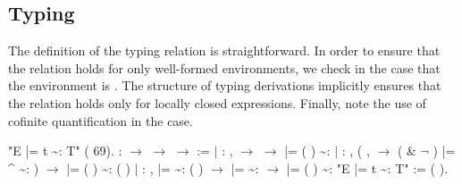 \documentclass[12pt]{report}
\begin{document}
\subsection{Typing}



 The definition of the typing relation is straightforward.  In
    order to ensure that the relation holds for only well-formed
    environments, we check in the  case that the
    environment is .  The structure of typing derivations
    implicitly ensures that the relation holds only for locally closed
    expressions.  Finally, note the use of cofinite quantification in
    the  case. 

\begin{coqdoccode}
\coqdocemptyline
\coqdocnoindent
{} "E |= t \~{}: T" (  69).\coqdoceol
\coqdocemptyline
\coqdocnoindent
{}  :  \ensuremath{\rightarrow}  \ensuremath{\rightarrow}  \ensuremath{\rightarrow}  :=\coqdoceol
\coqdocindent{1.00em}
\ensuremath{|}  : \coqdockw{\ensuremath{\forall}}   ,\coqdoceol
\coqdocindent{3.00em}
  \ensuremath{\rightarrow}\coqdoceol
\coqdocindent{3.00em}
    \ensuremath{\rightarrow}\coqdoceol
\coqdocindent{3.00em}
 |= ( ) \~{}: \coqdoceol
\coqdocindent{1.00em}
\ensuremath{|}  : \coqdockw{\ensuremath{\forall}}     ,\coqdoceol
\coqdocindent{3.00em}
(\coqdockw{\ensuremath{\forall}} ,    \ensuremath{\rightarrow} \coqdoceol
\coqdocindent{4.00em}
( \&  \ensuremath{\lnot} ) |=  \^{}  \~{}: ) \ensuremath{\rightarrow}\coqdoceol
\coqdocindent{3.00em}
 |= ( ) \~{}: (  )\coqdoceol
\coqdocindent{1.00em}
\ensuremath{|}  : \coqdockw{\ensuremath{\forall}}     ,\coqdoceol
\coqdocindent{3.00em}
 |=  \~{}: (  ) \ensuremath{\rightarrow} \coqdoceol
\coqdocindent{3.00em}
 |=  \~{}:  \ensuremath{\rightarrow}\coqdoceol
\coqdocindent{3.00em}
 |= (  ) \~{}: \coqdoceol
\coqdocnoindent
\coqdoceol
\coqdocnoindent
{} "E |= t \~{}: T" := (   ).\coqdoceol
\coqdocemptyline
\end{coqdoccode}
\end{document}
